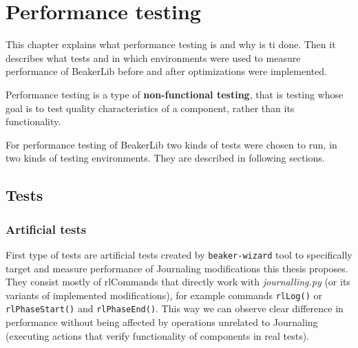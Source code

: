 \chapter{Performance testing}
\label{performance}

This chapter explains what performance testing is and why is ti done. Then it describes what tests and in which environments were used to measure performance of BeakerLib before and after optimizations were implemented.


Performance testing is a type of \textbf{non-functional testing}, that is testing whose goal is to test quality characteristics of a component, rather than its functionality\cite{non-functional_testing}.

For performance testing of BeakerLib two kinds of tests were chosen to run, in two kinds of testing environments. They are described in following sections.

\section{Tests}

\subsection{Artificial tests}
First type of tests are artificial tests created by \texttt{beaker-wizard} tool to specifically target and measure performance of Journaling modifications this thesis proposes. They consist mostly of rlCommands that directly work with \textit{journalling.py} (or its variants of implemented modifications), for example commands \texttt{rlLog()} or \texttt{rlPhaseStart()} and \texttt{rlPhaseEnd()}. This way we can observe clear difference in performance without being affected by operations unrelated to Journaling (executing actions that verify functionality of components in real tests). 

